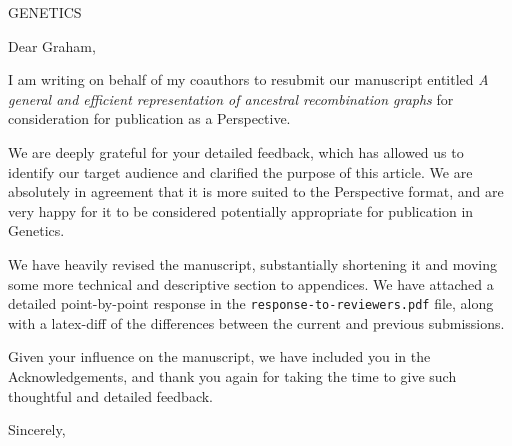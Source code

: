 \documentclass{letter}
\begin{document}
\begin{letter}{GENETICS}

\opening{Dear Graham,}

I am writing on behalf of my coauthors to resubmit our 
manuscript entitled
\emph{A general and efficient representation of ancestral recombination graphs}
for consideration for publication as a Perspective.

We are deeply grateful for your detailed feedback, which has allowed us 
to identify our target audience and clarified the purpose of this article.
We are absolutely in agreement that it is more suited to the Perspective
format, and are very happy for it to be considered potentially appropriate
for publication in Genetics.

We have heavily revised the manuscript, substantially shortening it
and moving some more technical and descriptive section to appendices.
We have attached a detailed point-by-point response in the 
\texttt{response-to-reviewers.pdf} file, along with a 
latex-diff of the differences between the current and previous submissions.

Given your influence on the manuscript, we have included you in the
Acknowledgements, and thank you again for taking the time to give
such thoughtful and detailed feedback.


\closing{Sincerely,}

\end{letter}
\end{document}
